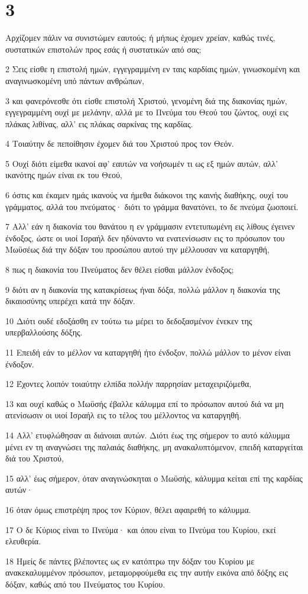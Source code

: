 \chapter{3}

\par Αρχίζομεν πάλιν να συνιστώμεν εαυτούς; ή μήπως έχομεν χρείαν, καθώς τινές, συστατικών επιστολών προς εσάς ή συστατικών από σας;
\par 2 Σεις είσθε η επιστολή ημών, εγγεγραμμένη εν ταις καρδίαις ημών, γινωσκομένη και αναγινωσκομένη υπό πάντων ανθρώπων,
\par 3 και φανερόνεσθε ότι είσθε επιστολή Χριστού, γενομένη διά της διακονίας ημών, εγγεγραμμένη ουχί με μελάνην, αλλά με το Πνεύμα του Θεού του ζώντος, ουχί εις πλάκας λιθίνας, αλλ' εις πλάκας σαρκίνας της καρδίας.
\par 4 Τοιαύτην δε πεποίθησιν έχομεν διά του Χριστού προς τον Θεόν.
\par 5 Ουχί διότι είμεθα ικανοί αφ' εαυτών να νοήσωμέν τι ως εξ ημών αυτών, αλλ' ικανότης ημών είναι εκ του Θεού,
\par 6 όστις και έκαμεν ημάς ικανούς να ήμεθα διάκονοι της καινής διαθήκης, ουχί του γράμματος, αλλά του πνεύματος· διότι το γράμμα θανατόνει, το δε πνεύμα ζωοποιεί.
\par 7 Αλλ' εάν η διακονία του θανάτου η εν γράμμασιν εντετυπωμένη εις λίθους έγεινεν ένδοξος, ώστε οι υιοί Ισραήλ δεν ηδύναντο να ενατενίσωσιν εις το πρόσωπον του Μωϋσέως διά την δόξαν του προσώπου αυτού την μέλλουσαν να καταργηθή,
\par 8 πως η διακονία του Πνεύματος δεν θέλει είσθαι μάλλον ένδοξος;
\par 9 διότι αν η διακονία της κατακρίσεως ήναι δόξα, πολλώ μάλλον η διακονία της δικαιοσύνης υπερέχει κατά την δόξαν.
\par 10 Διότι ουδέ εδοξάσθη εν τούτω τω μέρει το δεδοξασμένον ένεκεν της υπερβαλλούσης δόξης.
\par 11 Επειδή εάν το μέλλον να καταργηθή ήτο ένδοξον, πολλώ μάλλον το μένον είναι ένδοξον.
\par 12 Έχοντες λοιπόν τοιαύτην ελπίδα πολλήν παρρησίαν μεταχειριζόμεθα,
\par 13 και ουχί καθώς ο Μωϋσής έβαλλε κάλυμμα επί το πρόσωπον αυτού διά να μη ατενίσωσιν οι υιοί Ισραήλ εις το τέλος του μέλλοντος να καταργηθή.
\par 14 Αλλ' ετυφλώθησαν αι διάνοιαι αυτών. Διότι έως της σήμερον το αυτό κάλυμμα μένει εν τη αναγνώσει της παλαιάς διαθήκης, μη ανακαλυπτόμενον, επειδή καταργείται διά του Χριστού,
\par 15 αλλ' έως σήμερον, όταν αναγινώσκηται ο Μωϋσής, κάλυμμα κείται επί της καρδίας αυτών·
\par 16 όταν όμως επιστρέψη προς τον Κύριον, θέλει αφαιρεθή το κάλυμμα.
\par 17 Ο δε Κύριος είναι το Πνεύμα· και όπου είναι το Πνεύμα του Κυρίου, εκεί ελευθερία.
\par 18 Ημείς δε πάντες βλέποντες ως εν κατόπτρω την δόξαν του Κυρίου με ανακεκαλυμμένον πρόσωπον, μεταμορφούμεθα εις την αυτήν εικόνα από δόξης εις δόξαν, καθώς από του Πνεύματος του Κυρίου.


